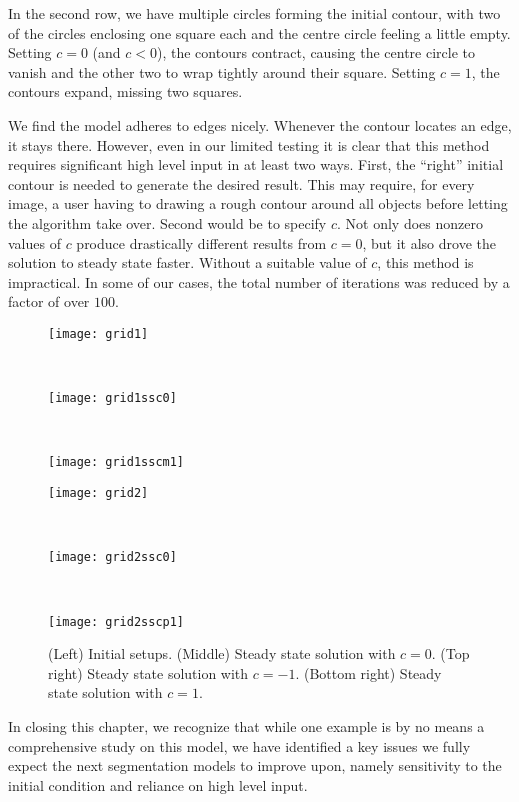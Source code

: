 In the second row, we have multiple circles forming the initial contour, with two of the circles enclosing one square each and the centre circle feeling a little empty. Setting $c = 0$ (and $c < 0$), the contours contract, causing the centre circle to vanish and the other two to wrap tightly around their square. Setting $c = 1$, the contours expand, missing two squares.
	
We find the model adheres to edges nicely. Whenever the contour locates an edge, it stays there. However, even in our limited testing it is clear that this method requires significant high level input in at least two ways. First, the ``right'' initial contour is needed to generate the desired result. This may require, for every image, a user having to drawing a rough contour around all objects before letting the algorithm take over. Second would be to specify $c$. Not only does nonzero values of $c$ produce drastically different results from $c = 0$, but it also drove the solution to steady state faster. Without a suitable value of $c$, this method is impractical. In some of our cases, the total number of iterations was reduced by a factor of over $100$.
	
\begin{figure}[htb!]
	\centering
	\begin{minipage}{0.31\textwidth}
				\texttt{[image: grid1]}
	\end{minipage}\,
	\begin{minipage}{0.31\textwidth}
		\texttt{[image: grid1ssc0]}
	\end{minipage}\,
	\begin{minipage}{0.31\textwidth}
		\texttt{[image: grid1sscm1]}
	\end{minipage}
	\begin{minipage}{0.31\textwidth}
		\texttt{[image: grid2]}
	\end{minipage}\,
	\begin{minipage}{0.31\textwidth}
		\texttt{[image: grid2ssc0]}
	\end{minipage}\,
	\begin{minipage}{0.31\textwidth}
		\texttt{[image: grid2sscp1]}
	\end{minipage}
	
	\caption{(Left) Initial setups. (Middle) Steady state solution with $c = 0$. (Top right) Steady state solution with $c = -1$. (Bottom right) Steady state solution with $c = 1$.}
	\label{fig:grid}
\end{figure}

In closing this chapter, we recognize that while one example is by no means a comprehensive study on this model, we have identified a key issues we fully expect the next segmentation models to improve upon, namely sensitivity to the initial condition and reliance on high level input.
	

